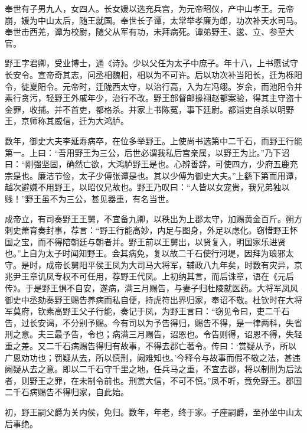 \documentclass[12pt,UTF8]{ctexbook}
\begin{document}
奉世有子男九人，女四人。长女媛以选充兵宫，为元帝昭仪，产中山孝王。元帝崩，媛为中山太后，随王就国。奉世长子谭，太常举孝廉为郎，功次补天水司马。奉世击西羌，谭为校尉，随父从军有功，未拜病死。谭弟野王、逡、立、参至大官。



野王字君卿，受业博士，通《诗》。少以父任为太子中庶子。年十八，上书愿试守长安令。宣帝奇其志，问丞相魏相，相以为不可许。后以功次补当阳长，迁为栎阳令，徙夏阳令。元帝时，迁陇西太守，以治行高，入为左冯翊。岁余，而池阳令并素行贪污，轻野王外戚年少，治行不改。野王部督邮掾祤赵都案验，得其主守盗十金罪，收捕。并不首吏，都格杀。并家上书陈冤，事下廷尉。都诣吏自杀以明野王，京师称其威信，迁为大鸿胪。



数年，御史大夫李延寿病卒，在位多举野王。上使尚书选第中二千石，而野王行能第一。上曰：“吾用野王为三公，后世必谓我私后宫亲属，以野王为比。”乃下诏曰：“刚强坚固，确然亡欲，大鸿胪野王是也。心辨善辞，可使四方，少府五鹿充宗是也。廉洁节俭，太子少傅张谭是也。其以少傅为御史大夫。”上繇下第而用谭，越次避嫌不用野王，以昭仪兄故也。野王乃叹曰：“人皆以女宠贵，我兄弟独以贱！”野王虽不为三公，甚见器重，有名当世。



成帝立，有司奏野王王舅，不宜备九卿，以秩出为上郡太守，加赐黄金百斤。朔方刺史萧育奏封事，荐言：“野王行能高妙，内足与图身，外足以虑化。窃惜野王怀国之宝，而不得陪朝廷与朝者并。野王前以王舅出，以贤复入，明国家乐进贤也。”上自为太子时闻知野王。会其病免，复以故二千石使行河堤，因拜为琅邪太守。是时，成帝长舅阳平侯王凤为大司马大将军，辅政八九年矣，时数有灾异，京兆尹王章讥凤专权不可任用，荐野王代凤。上初纳其言，而后诛章，语在《元后传》。于是野王惧不自安，遂病，满三月赐告，与妻子归杜陵就医药。大将军凤风御史中丞劾奏野王赐告养病而私自便，持虎符出界归家，奉诏不敬。杜钦时在大将军莫府，钦素高野王父子行能，奏记于凤，为野王言曰：“窃见令曰，吏二千石告，过长安谒，不分别予赐。今有司以为予告得归，赐告不得，是一律两科，失省刑之意。夫三最予告，令也；病满三月赐告，诏恩也。令告则得，诏恩不得，失轻重之差。又二千石病赐告得归有故事，不得去郡亡著令。传曰：‘赏疑从予，所以广恩劝功也；罚疑从去，所以慎刑，阙难知也。’今释令与故事而假不敬之法，甚违阙疑从去之意。即以二千石守千里之地，任兵马之重，不宜去郡，将以制刑为后法者，则野王之罪，在未制令前也。刑赏大信，不可不慎。”凤不听，竟免野王。郡国二千石病赐告不得归家，自此始。



初，野王嗣父爵为关内侯，免归。数年，年老，终于家。子座嗣爵，至孙坐中山太后事绝。
\end{document}
